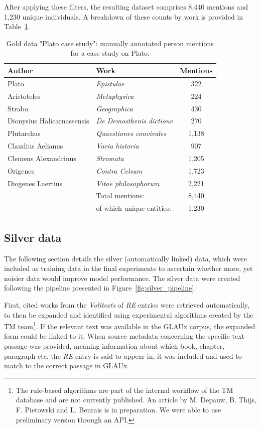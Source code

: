 \documentclass[final]{anthology-ch}
\begin{document}
After applying these filters, the resulting dataset comprises 8,440 mentions and 1,230 unique individuals. A breakdown of these counts by work is provided in Table~\ref{tab:gold_plato}.

\begin{table}[ht]
\centering
\begin{tabular}{llc}
\textbf{Author} & \textbf{Work} & \textbf{Mentions}\\
\toprule
Plato & \textit{Epistulae} & 322\\
Aristoteles & \textit{Metaphysica} & 224 \\
Strabo & \textit{Geographica} & 430\\
Dionysius Halicarnassensis & \textit{De Demosthenis dictione} & 270 \\
Plutarchus & \textit{Quaestiones convivales} & 1,138 \\
Claudius Aelianus & \textit{Varia historia} & 907 \\
Clemens Alexandrinus & \textit{Stromata} & 1,205\\
Origenes & \textit{Contra Celsum} & 1,723\\
Diogenes Laertius & \textit{Vitae philosophorum} & 2,221 \\
\midrule
& Total mentions: & 8,440\\
& of which unique entities: & 1,230\\
\bottomrule
\end{tabular}
\caption{Gold data "Plato case study": manually annotated person mentions for a case study on Plato.
}
\label{tab:gold_plato}
\end{table}

\newpage
\subsection{Silver data} \label{sec:silver_data}
The following section details the silver (automatically linked) data, which were included as training data in the final experiments to ascertain whether more, yet noisier data would improve model performance. The silver data were created following the pipeline presented in Figure~\ref{fig:silver_pipeline}.

First, cited works from the \textit{Volltexts} of \textit{RE} entries were retrieved automatically, to then be expanded and identified using experimental algorithms created by the TM team\footnote{The rule-based algorithms are part of the internal workflow of the TM database and are not currently published. An article by M. Depauw, B. Thijs, F. Pietowski and L. Benrais is in preparation. We were able to use preliminary version through an API.}.
If the relevant text was available in the GLAUx corpus, the expanded form could be linked to it. When source metadata concerning the specific text passage was provided, meaning information about which book, chapter, paragraph etc. the \textit{RE} entry is said to appear in, it was included and used to match to the correct passage in GLAUx.
\end{document}
